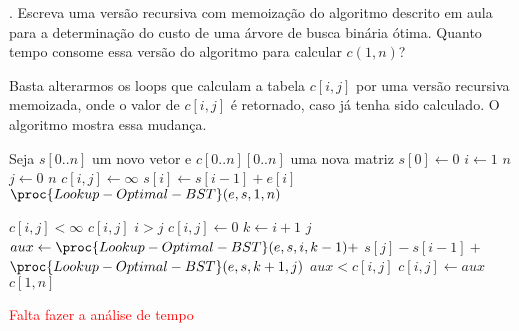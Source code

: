 
. Escreva uma versão recursiva com memoização do algoritmo descrito em aula para a determinação do custo de uma árvore de busca binária ótima. Quanto tempo consome essa versão do algoritmo para calcular $c(1, n)$?

Basta alterarmos os loops que calculam a tabela $c[i, j]$ por uma versão recursiva memoizada, onde o valor de $c[i, j]$ é retornado, caso já tenha sido calculado. O algoritmo  mostra essa mudança.

\begin{codebox}
\li \Comment Seja $s[0..n]$ um novo vetor e $c[0..n][0..n]$ uma nova matriz
\li $s[0] \gets 0$
\li \For $i \gets 1$ \To $n$
\li \Do
        \For $j \gets 0$ \To $n$
\li     \Do
            $c[i, j] \gets \infty$
        \End
\li     $s[i] \gets s[i-1] + e[i]$
    \End
\li \Return $\proc{Lookup-Optimal-BST}(e, s, 1, n)$
\end{codebox}

\begin{codebox}
\li \If $c[i, j] < \infty$
\li \Then
        \Return $c[i, j]$
    \End
\li \If $i > j$
\li \Then
        $c[i, j] \gets 0$
\li \Else
        \For $k \gets i+1$ \To $j$
\li     \Do
            $aux \gets \proc{Lookup-Optimal-BST}(e, s, i, k-1) +$
            \Indentmore
\zi         $s[j] - s[i-1] +$
\zi         $\proc{Lookup-Optimal-BST}(e, s, k+1, j)$
            \End
\li         \If $aux < c[i, j]$
\li         \Then
                $c[i, j] \gets aux$
            \End
        \End
    \End
\li \Return $c[1, n]$
\end{codebox}

\textcolor{red}{Falta fazer a análise de tempo}\\[12pt]